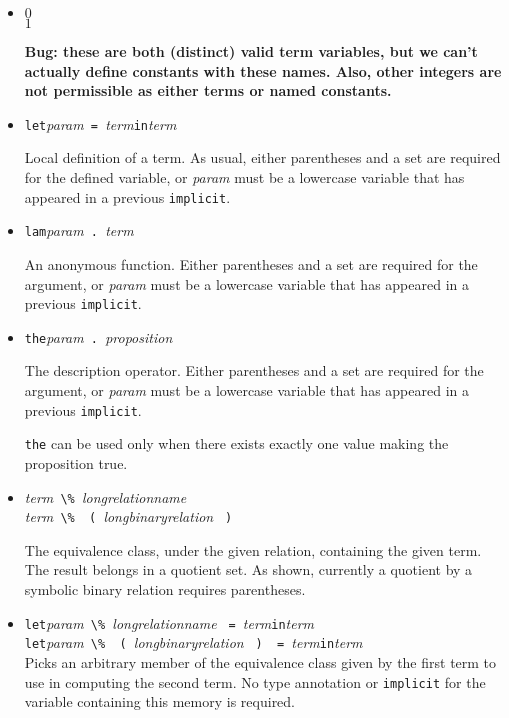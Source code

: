 \documentclass{article}
\newcommand{\keywd}[1]{\mbox{\texttt{#1}}\xspace}
\newcommand{\IMPLICIT}{\keywd{implicit}}
\newcommand{\IN}{\keywd{in}}
\newcommand{\LAMBDA}{\keywd{lam}}
\newcommand{\LET}{\keywd{let}}
\newcommand{\THE}{\keywd{the}}
\newcommand{\metav}[1]{\mbox{\textit{#1}}\xspace}
\newcommand{\Label}{\metav{\Verb|`|label}}
\newcommand{\Proposition}{\metav{proposition}}
\newcommand{\Param}{\metav{param}}
\newcommand{\Term}{\metav{term}}
\newcommand{\EQUALS}{\mbox{\Verb| = |}}
\newcommand{\LPAREN}{\mbox{\Verb| ( |}}
\newcommand{\PERCENT}{\mbox{\Verb+ \% +}}
\newcommand{\RPAREN}{\mbox{\Verb| ) |}}
\newcommand{\PERIOD}{\mbox{\Verb| . |}}
\newcommand{\NB}{\textbf{NB: }}
\begin{document}
\begin{itemize}
  \NB A single identifier in a pattern-matching case need not
  be described in an \IMPLICIT; there is enough information from
  looking at the \Term and the \Label.

\item $0$\\
      $1$

  \textbf{Bug: these are both (distinct) valid term variables, but we can't actually
  define constants with these names.  Also, other integers are not permissible
  as either terms or named constants.}

\item \LET \Param \EQUALS \Term \IN \Term
  
  Local definition of a term.  As usual, either parentheses and a set
  are required for the defined variable, or \Param must be a lowercase
  variable that has appeared in a previous \IMPLICIT.

\item \LAMBDA \Param \PERIOD \Term
  
  An anonymous function.  Either parentheses and a set are required
  for the argument, or \Param must be a lowercase variable that has
  appeared in a previous \IMPLICIT.

\item \THE \Param \PERIOD \Proposition

  The description operator.  Either parentheses and a set are required
  for the argument, or \Param must be a lowercase variable that has
  appeared in a previous \IMPLICIT.  

  \THE can be used only when there exists exactly one value making
  the proposition true.

\item \Term \PERCENT \metav{longrelationname}\\
      \Term \PERCENT \LPAREN \metav{longbinaryrelation} \RPAREN

  The equivalence class, under the given relation, containing the
  given term.  The result belongs in a quotient set.  As shown,
  currently a quotient by a symbolic binary relation requires
  parentheses.

\item \LET \Param \PERCENT \metav{longrelationname} \EQUALS \Term \IN \Term\\
      \LET \Param \PERCENT \LPAREN \metav{longbinaryrelation} \RPAREN \EQUALS \Term \IN \Term\\

  Picks an arbitrary member of the equivalence class given by the first
  term to use in computing the second term.  No type annotation or
  \IMPLICIT for the variable containing this memory is required.


\end{itemize}
\end{document}
